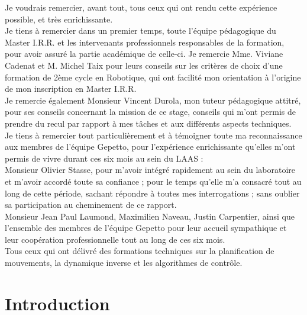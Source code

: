 \documentclass{report}
\begin{document}
Je voudrais remercier, avant tout, tous ceux qui ont rendu cette expérience possible, et très enrichissante.\\
Je tiens à remercier dans un premier temps, toute l’équipe pédagogique du Master I.R.R. et les intervenants professionnels responsables de la formation, pour avoir assuré la partie académique de celle-ci. Je remercie Mme. Viviane Cadenat et M. Michel Taix pour leurs conseils sur les critères de choix d'une formation de 2ème cycle en Robotique, qui ont facilité mon orientation à l'origine de mon inscription en Master I.R.R.\\
Je remercie également Monsieur Vincent Durola, mon tuteur pédagogique attitré, pour ses conseils concernant la mission de ce stage, conseils qui m'ont permis de prendre du recul par rapport à mes tâches et aux différents aspects techniques.\\
Je tiens à remercier tout particulièrement et à témoigner toute ma reconnaissance aux membres de l'équipe Gepetto, pour l’expérience enrichissante qu’elles m’ont permis de vivre durant ces six mois au sein du LAAS :\\
Monsieur Olivier Stasse, pour m’avoir intégré rapidement au sein du laboratoire et m’avoir accordé toute sa confiance ; pour le temps qu’elle m’a consacré tout au long de cette période, sachant répondre à toutes mes interrogations ; sans oublier sa participation au cheminement de ce rapport.\\
Monsieur Jean Paul Laumond, Maximilien Naveau, Justin Carpentier, ainsi que l’ensemble des membres de l'équipe Gepetto pour leur accueil sympathique et leur coopération professionnelle tout au long de ces six mois.\\
Tous ceux qui ont délivré des formations techniques sur la planification de mouvements, la dynamique inverse et les algorithmes de contrôle.\\

\vspace{0.3cm} %




\glsaddall
\printglossary


\chapter*{Introduction}
\end{document}
